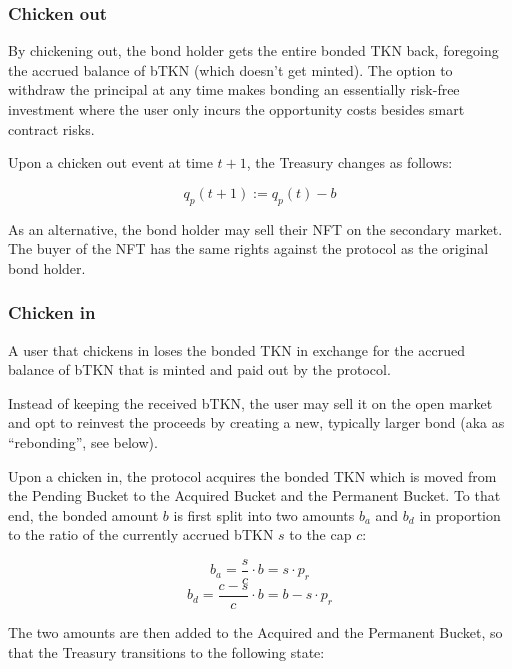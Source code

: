 \documentclass{article}
\begin{document}
\subsubsection{Chicken out}
\label{sec:chicken-out}
By chickening out, the bond holder gets the entire bonded TKN back, foregoing the accrued balance of bTKN (which doesn’t get minted). The option to withdraw the principal at any time makes bonding an essentially risk-free investment where the user only incurs the opportunity costs besides smart contract risks.

Upon a chicken out event at time $t+1$, the Treasury changes as follows:

\begin{equation}
  \label{eq:chicken-out-transition}
    q_p(t+1) := q_p(t) - b
\end{equation}

As an alternative, the bond holder may sell their NFT on the secondary market. The buyer of the NFT has the same rights against the protocol as the original bond holder.

\subsubsection{Chicken in}
\label{sec:chicken-in}
A user that chickens in loses the bonded TKN in exchange for the accrued balance of bTKN that is minted and paid out by the protocol. 

Instead of keeping the received bTKN, the user may sell it on the open market and opt to reinvest the proceeds by creating a new, typically larger bond (aka as “rebonding”, see below).

Upon a chicken in, the protocol acquires the bonded TKN which is moved from the Pending Bucket to the Acquired Bucket and the Permanent Bucket. To that end, the bonded amount $b$ is first split into two amounts $b_a$ and $b_d$ in proportion to the ratio of the currently accrued bTKN $s$ to the cap $c$:

\begin{equation}
  \label{eq:chicken-in-ba}
    b_a = \frac{s}{c} \cdot b = s \cdot p_r
\end{equation}
\begin{equation}
  \label{eq:chicken-in-bd}
    b_d = \frac{c-s}{c} \cdot b = b - s \cdot p_r
\end{equation}

The two amounts are then added to the Acquired and the Permanent Bucket, so that the Treasury transitions to the following state:
\end{document}
